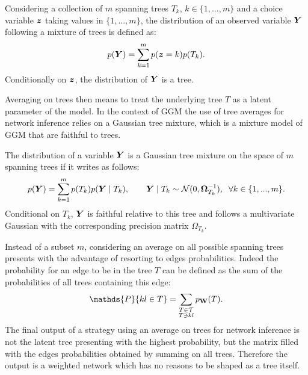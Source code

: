  
 \begin{definition}
 Considering a collection of $m$ spanning trees $T_k$, $k\in\{1,...,m\}$ and a choice variable ${\boldsymbol{z}}$ taking values in $\{1,...,m\}$, the distribution of an observed variable ${\boldsymbol{Y}}$ following a  mixture of trees  is defined as:
$$ p({\boldsymbol{Y}}) = \sum_{k=1}^m p({\boldsymbol{z}}=k) p(T_k).$$
Conditionally on ${\boldsymbol{z}}$, the distribution of ${\boldsymbol{Y}}$ is a tree.
 \end{definition}

Averaging on trees then means to treat the underlying tree $T$ as a latent parameter of the model. In the context of GGM  the use of tree averages for network inference relies on a Gaussian tree mixture, which is a mixture model of GGM that are faithful to trees.
\begin{definition}\label{treemixt}
The distribution of a variable ${\boldsymbol{Y}}$ is a Gaussian tree mixture on the space of $m$ spanning trees if it writes as follows:
$$p({\boldsymbol{Y}}) = \sum_{k=1}^m  p(T_k) p({\boldsymbol{Y}}\mid T_k),\qquad  {\boldsymbol{Y}}\mid T_k\sim\mathcal{N} (0, {\boldsymbol{\Omega}}_{T_k}^{-1}), \;\; \forall k\in\{1,...,m\}.$$
Conditional on $T_k$, ${\boldsymbol{Y}}$ is faithful relative to this tree and follows a multivariate Gaussian with the corresponding precision matrix $\Omega_{T_k}$.
\end{definition}
 
Instead of a subset $m$, considering an average on all possible spanning trees %
presents with the advantage of  resorting to edges probabilities. Indeed the probability for an edge to be in the tree $T$ can be defined as the sum of the probabilities of all trees containing this edge:
$$\mathds{P}\{kl\in T\} = \sum_{\substack{T\in \mathcal{T}\\ T \ni kl}} p_{\Wbf}(T).$$
The final output of a strategy using an average on trees for network inference is not the latent tree presenting with the highest probability, but the matrix filled with the edges probabilities obtained by summing on all trees. Therefore the output is a weighted network which has no reasons to be shaped as a tree itself.\\

